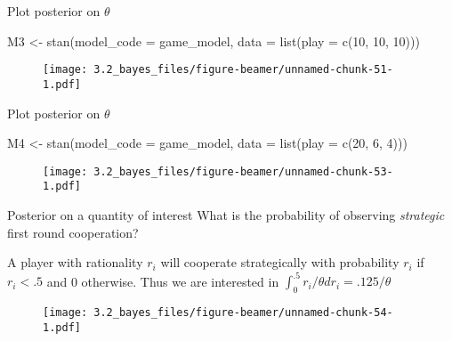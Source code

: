 \documentclass[
  11pt,
  ignorenonframetext,
]{beamer}
\newenvironment{Shaded}{\begin{snugshade}}{\end{snugshade}}
\newcommand{\AttributeTok}[1]{\textcolor[rgb]{0.40,0.45,0.13}{#1}}
\newcommand{\DecValTok}[1]{\textcolor[rgb]{0.68,0.00,0.00}{#1}}
\newcommand{\FunctionTok}[1]{\textcolor[rgb]{0.28,0.35,0.67}{#1}}
\newcommand{\NormalTok}[1]{\textcolor[rgb]{0.00,0.23,0.31}{#1}}
\newcommand{\OtherTok}[1]{\textcolor[rgb]{0.00,0.23,0.31}{#1}}
\begin{document}
\begin{frame}[fragile]{Plot posterior on \(\theta\)}
\protect\hypertarget{plot-posterior-on-theta-2}{}
\begin{Shaded}
\begin{Highlighting}[]
\NormalTok{M3 }\OtherTok{\textless{}{-}} \FunctionTok{stan}\NormalTok{(}\AttributeTok{model\_code =}\NormalTok{ game\_model, }\AttributeTok{data =} \FunctionTok{list}\NormalTok{(}\AttributeTok{play =} \FunctionTok{c}\NormalTok{(}\DecValTok{10}\NormalTok{,}
    \DecValTok{10}\NormalTok{, }\DecValTok{10}\NormalTok{)))}
\end{Highlighting}
\end{Shaded}

\begin{figure}

{\centering \texttt{[image: 3.2\_bayes\_files/figure-beamer/unnamed-chunk-51-1.pdf]}

}

\end{figure}
\end{frame}

\begin{frame}[fragile]{Plot posterior on \(\theta\)}
\protect\hypertarget{plot-posterior-on-theta-3}{}
\begin{Shaded}
\begin{Highlighting}[]
\NormalTok{M4 }\OtherTok{\textless{}{-}} \FunctionTok{stan}\NormalTok{(}\AttributeTok{model\_code =}\NormalTok{ game\_model, }\AttributeTok{data =} \FunctionTok{list}\NormalTok{(}\AttributeTok{play =} \FunctionTok{c}\NormalTok{(}\DecValTok{20}\NormalTok{,}
    \DecValTok{6}\NormalTok{, }\DecValTok{4}\NormalTok{)))}
\end{Highlighting}
\end{Shaded}

\begin{figure}

{\centering \texttt{[image: 3.2\_bayes\_files/figure-beamer/unnamed-chunk-53-1.pdf]}

}

\end{figure}
\end{frame}

\begin{frame}{Posterior on a quantity of interest}
\protect\hypertarget{posterior-on-a-quantity-of-interest-1}{}
What is the probability of observing \emph{strategic} first round
cooperation?

A player with rationality \(r_i\) will cooperate strategically with
probability \(r_i\) if \(r_i<.5\) and 0 otherwise. Thus we are
interested in \(\int_0^{.5}r_i/\theta dr_i = .125/\theta\)

\begin{figure}

{\centering \texttt{[image: 3.2\_bayes\_files/figure-beamer/unnamed-chunk-54-1.pdf]}

}

\end{figure}
\end{frame}
\end{document}
